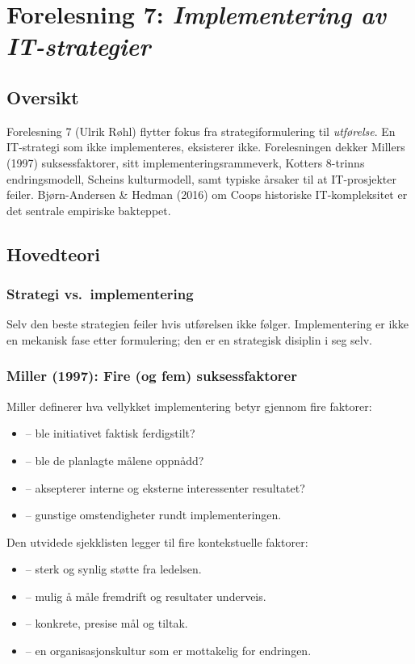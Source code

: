 \section{Forelesning 7: \emph{Implementering av IT-strategier}}
\label{sec:lec07}

\subsection*{Oversikt}
Forelesning 7 (Ulrik Røhl) flytter fokus fra strategiformulering til
\emph{utførelse}. En IT-strategi som ikke implementeres, eksisterer ikke.
Forelesningen dekker Millers (1997) suksessfaktorer,  sitt
implementeringsrammeverk, Kotters 8-trinns endringsmodell, Scheins
kulturmodell, samt typiske årsaker til at IT-prosjekter feiler.
Bjørn-Andersen \& Hedman (2016) om Coops historiske IT-kompleksitet er det
sentrale empiriske bakteppet.

\subsection{Hovedteori}

\subsubsection*{Strategi vs.\ implementering}
 Selv den beste
strategien feiler hvis utførelsen ikke følger. Implementering er ikke en
mekanisk fase etter formulering; den er en strategisk disiplin i seg selv.

\subsubsection*{Miller (1997): Fire (og fem) suksessfaktorer}
Miller definerer hva \guillemotleft{}vellykket implementering\guillemotright{} betyr gjennom fire faktorer:
\begin{itemize}
  \item {} -- ble initiativet faktisk ferdigstilt?
  \item {} -- ble de planlagte målene oppnådd?
  \item {} -- aksepterer interne og eksterne interessenter
    resultatet?
  \item {} -- gunstige omstendigheter rundt
    implementeringen.
\end{itemize}
Den utvidede sjekklisten legger til fire kontekstuelle faktorer:
\begin{itemize}
  \item {} -- sterk og synlig støtte fra ledelsen.
  \item {} -- mulig å måle fremdrift og resultater
    underveis.
  \item {} -- konkrete, presise mål og tiltak.
  \item {} -- en organisasjonskultur som er
    mottakelig for endringen.
\end{itemize}

